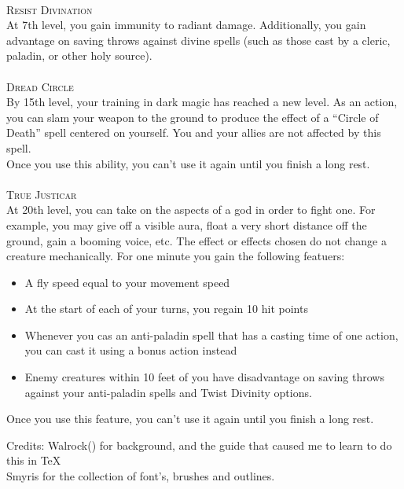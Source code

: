 \documentclass[22pt,a4paper]{article}
\begin{document}
\begin{multicols*}{2}
\\
{\fontsize{12pt}{12pt}\textcolor{title}{\textsc{Resist Divination}}}\\
At 7th level, you gain immunity to radiant damage. Additionally, you gain advantage on saving throws against divine spells (such as those cast by a cleric, paladin, or other holy source).\\
\\
{\fontsize{12pt}{12pt}\textcolor{title}{\textsc{Dread Circle}}}\\
By 15th level, your training in dark magic has reached a new level. As an action, you can slam your weapon to the ground to produce the effect of a “Circle of Death” spell centered on yourself. You and your allies are not affected by this spell.\\
\indent Once you use this ability, you can’t use it again until you finish a long rest. \\
\\
{\fontsize{12pt}{12pt}\textcolor{title}{\textsc{True Justicar}}}\\
At 20th level, you can take on the aspects of a god in order to fight one. For example, you may give off a visible aura, float a very short distance off the ground, gain a booming voice, etc. The effect or effects chosen do not change a creature mechanically.
\indent For one minute you gain the following featuers:\\
\begin{itemize}
\setlength\itemsep{-6pt}
\item A fly speed equal to your movement speed
\item At the start of each of your turns, you regain 10 hit points
\item Whenever you cas an anti-paladin spell that has a casting time of one action, you can cast it using a bonus action instead
\item Enemy creatures within 10 feet of you have disadvantage on saving throws against your anti-paladin spells and Twist Divinity options.
\end{itemize}
Once you use this feature, you can't use it again until you finish a long rest.
\end{multicols*}
\newpage
Credits:
Walrock() for background, and the guide that caused me to learn to do this in \TeX\\
Smyris for the collection of font's, brushes and outlines.\\
\end{document}
